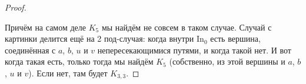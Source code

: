 \documentclass{article}
\begin{document}
\begin{proof}
\begin{figure}[H]
        \end{figure}\noindent
        Причём на самом деле $K_5$ мы найдём не совсем в таком случае. Случай с картинки делится ещё на 2 под-случая: когда внутри $\mathrm{In_0}$ есть вершина, соединённая с $a$, $b$, $u$ и $v$ непересекающимися путями, и когда такой нет. И вот когда такая есть, только тогда мы найдём $K_5$ (собственно, из этой вершины и $a$, $b$, $u$ и $v$). Если нет, там будет $K_{3,3}$.
    \end{proof}
\end{document}
